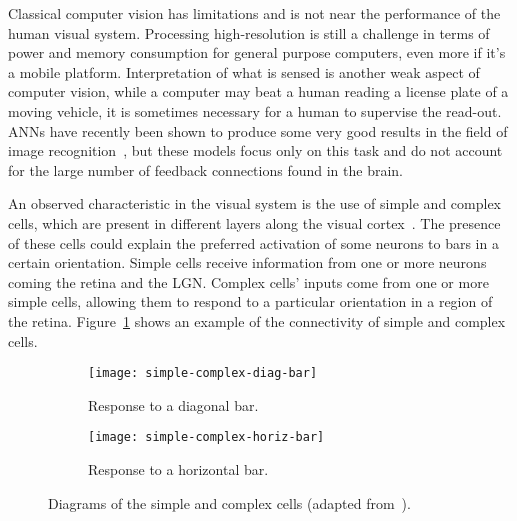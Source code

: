 Classical computer vision has limitations and is not near the performance of the human visual system. Processing high-resolution is still a challenge in terms of power and memory consumption for general purpose computers, even more if it's a mobile platform. Interpretation of what is sensed is another weak aspect of computer vision, while a computer may beat a human reading a license plate of a moving vehicle, it is sometimes necessary for a human to supervise the read-out. ANNs have recently been shown to produce some very  good results in the field of image recognition~\cite{krizhevsky2012imagenet}, but these models focus only on this task and do not account for the large number of feedback connections found in the brain.

An observed characteristic in the visual system is the use of simple and complex cells, which are present in different layers along the visual cortex~\cite{hubel1962receptive,thompson2000brain}. The presence of these cells could explain the preferred activation of some neurons to bars in a certain orientation. Simple cells receive information from one or more neurons coming the retina and the LGN. Complex cells' inputs come from one or more simple cells, allowing them to respond to a particular orientation in a region of the retina. Figure~\ref{fig:vision:simple-complex} shows an example of the connectivity of simple and complex cells.

\begin{figure}[h]
  \begin{center}
    \begin{subfigure}[t]{0.4\textwidth}
      \texttt{[image: simple-complex-diag-bar]}
      \caption{Response to a diagonal bar.}
    \end{subfigure}
    \begin{subfigure}[t]{0.4\textwidth}
      \texttt{[image: simple-complex-horiz-bar]}
      \caption{Response to a horizontal bar.}
    \end{subfigure}
    \caption{Diagrams of the simple and complex cells (adapted from~\cite{wikipedia-images}). }
    \label{fig:vision:simple-complex}
  \end{center}
\end{figure}

